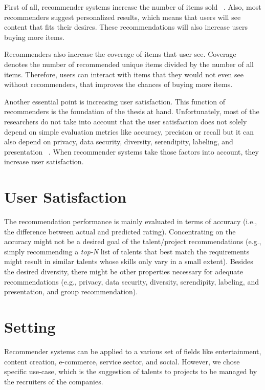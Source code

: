First of all, recommender systems increase the number of items sold  ~\parencite{Ricci2015}.  Also, most recommenders suggest personalized results, which means that users will see content that fits their desires. These recommendations will also increase users buying more items.

Recommenders also increase the coverage of items that user see. Coverage denotes the number of recommended unique items divided by the number of all items. Therefore, users can interact with items that they would not even see without recommenders, that improves the chances of buying more items.

Another essential point is increasing user satisfaction. This function of recommenders is the foundation of the thesis at hand. Unfortunately, most of the researchers do not take into account that the user satisfaction does not solely depend on simple evaluation metrics like accuracy, precision or recall but it can also depend on privacy, data security, diversity, serendipity, labeling, and presentation ~\parencite{Beel2016}. When recommender systems take those factors into account, they increase user satisfaction.

\section{User Satisfaction}

The recommendation performance is mainly evaluated in terms of accuracy (i.e., the difference between actual and predicted rating). Concentrating on the accuracy might not be a desired goal of the talent/project recommendations (e.g., simply recommending a \textit{top-N} list of talents that best match the requirements might result in similar talents whose skills only vary in a small extent). Besides the desired diversity, there might be other properties necessary for adequate recommendations (e.g., privacy, data security, diversity, serendipity, labeling, and presentation, and group recommendation).

\section{Setting}

Recommender systems can be applied to a various set of fields like entertainment, content creation, e-commerce, service sector, and social. However, we chose specific use-case, which is the suggestion of talents to projects to be managed by the recruiters of the companies.


